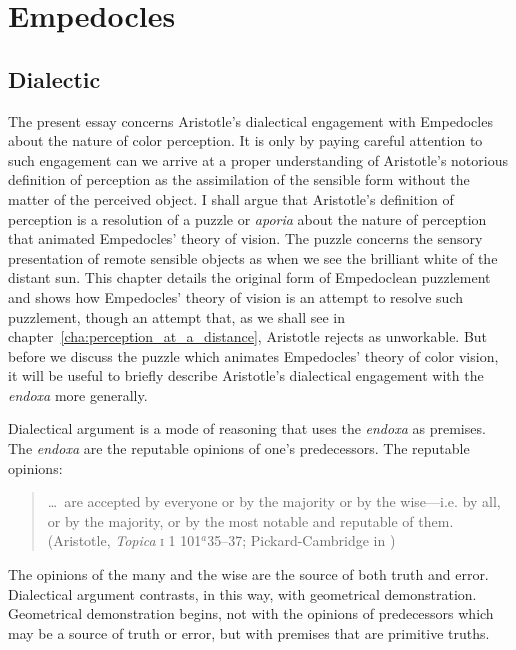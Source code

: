 \chapter{Empedocles} %
\label{cha:empedocles}

\section{Dialectic} %
\label{sec:dialectic}

The present essay concerns Aristotle's dialectical engagement with Empedocles about the nature of color perception. It is only by paying careful attention to such engagement can we arrive at a proper understanding of Aristotle's notorious definition of perception as the assimilation of the sensible form without the matter of the perceived object. I shall argue that Aristotle's definition of perception is a resolution of a puzzle or \emph{aporia} about the nature of perception that animated Empedocles' theory of vision. The puzzle concerns the sensory presentation of remote sensible objects as when we see the brilliant white of the distant sun. This chapter details the original form of Empedoclean puzzlement and shows how Empedocles' theory of vision is an attempt to resolve such puzzlement, though an attempt that, as we shall see in chapter~\ref{cha:perception_at_a_distance}, Aristotle rejects as unworkable. But before we discuss the puzzle which animates Empedocles' theory of color vision, it will be useful to briefly describe Aristotle's dialectical engagement with the \emph{endoxa} more generally.

Dialectical argument is a mode of reasoning that uses the \emph{endoxa} as premises. The \emph{endoxa} are the reputable opinions of one's predecessors. The reputable opinions:
\begin{quote}
	\ldots\ are accepted by everyone or by the majority or by the wise---i.e. by all, or by the majority, or by the most notable and reputable of them. (Aristotle, \emph{Topica} \textsc{i} 1 101\( ^{a} \)35--37; Pickard-Cambridge in \citealt[2-3]{Barnes:1984uq})
\end{quote}
The opinions of the many and the wise are the source of both truth and error. Dialectical argument contrasts, in this way, with geometrical demonstration. Geometrical demonstration begins, not with the opinions of predecessors which may be a source of truth or error, but with premises that are primitive truths.

